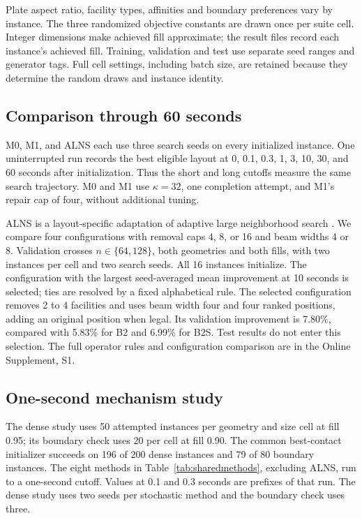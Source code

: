 \documentclass[preprint,12pt,authoryear,nonatbib]{elsarticle}
\begin{document}
Plate aspect ratio, facility types, affinities and boundary preferences vary
by instance. The three randomized objective constants are drawn once per suite
cell. Integer dimensions make achieved fill approximate; the result files
record each instance's achieved fill. Training, validation and test use separate
seed ranges and generator tags. Full cell settings, including batch size, are
retained because they determine the random draws and instance identity.

\subsection{Comparison through 60 seconds}
\label{sec:extendedprotocol}
M0, M1, and ALNS each use three search seeds on every initialized instance.
One uninterrupted run records the best eligible layout at 0, 0.1, 0.3, 1,
3, 10, 30, and 60 seconds after initialization. Thus the short and long
cutoffs measure the same search trajectory. M0 and M1 use $\kappa=32$, one
completion attempt, and M1's repair cap of four, without additional tuning.

ALNS is a layout-specific adaptation of adaptive large neighborhood search
\citep{Ropke2006ALNS}. We compare four configurations with removal caps
4, 8, or 16 and beam widths 4 or 8. Validation crosses $n\in\{64,128\}$,
both geometries and both fills, with two instances per cell and two search
seeds. All 16 instances initialize. The configuration with the largest
seed-averaged mean improvement at 10 seconds is selected; ties are resolved
by a fixed alphabetical rule. The selected configuration removes 2 to 4
facilities and uses beam width four and four ranked positions, adding an
original position when legal. Its validation improvement is 7.80\%, compared
with 5.83\% for B2 and 6.99\% for B2S. Test results do not enter this selection.
The full operator rules and configuration comparison are in the Online
Supplement, S1.

\subsection{One-second mechanism study}
The dense study uses 50 attempted instances per geometry and size cell at
fill 0.95; its boundary check uses 20 per cell at fill 0.90. The common
best-contact initializer succeeds on 196 of 200 dense instances and 79 of 80
boundary instances. The eight methods in Table~\ref{tab:sharedmethods},
excluding ALNS, run to a one-second cutoff. Values at 0.1 and 0.3 seconds
are prefixes of that run. The dense study uses two seeds per stochastic method
and the boundary check uses three.
\end{document}
